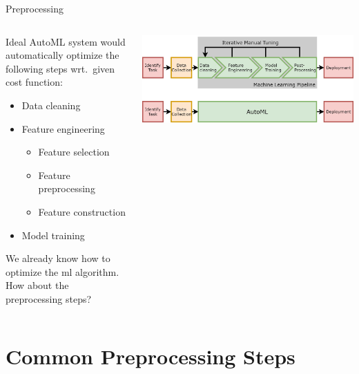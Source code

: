 \begin{frame}{Preprocessing}
  \begin{columns}
    \begin{column}{0.5\textwidth} 
      Ideal AutoML system would automatically optimize the following steps wrt.\ given cost function:
      \begin{itemize}
        \item[\ding{55}] Data cleaning
        \item[\ding{55}] Feature engineering
        \begin{itemize}
          \item Feature selection
          \item Feature preprocessing
          \item Feature construction  
        \end{itemize}
        \item[\ding{51}] Model training
      \end{itemize}
    We already know how to optimize the ml algorithm. How about the preprocessing steps?
    \end{column}%
    \begin{column}{0.5\textwidth}
      \begin{center}
        \includegraphics[width = \linewidth]{images/AutoMLPipeline.jpg}  
      \end{center}
    \end{column}
  \end{columns}
  
\end{frame}

\section{Common Preprocessing Steps}

